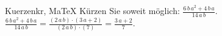 \begin{MAufgabe}{Kuerzen}{kr, MaTeX}
K\"urzen Sie soweit m\"oglich: $\frac{6\, b\, a^2 + 4\, b\, a}{14\, a\, b}$.\\ 
\ifLsg\MLoesung
\quad $\frac{6\, b\, a^2 + 4\, b\, a}{14\, a\, b}=\frac{(2\, a\, b)\cdot(3\, a + 2)}{(2\, a\, b)\cdot(7)}=\frac{3\, a + 2}{7}$.\else\relax\fi
 \end{MAufgabe}